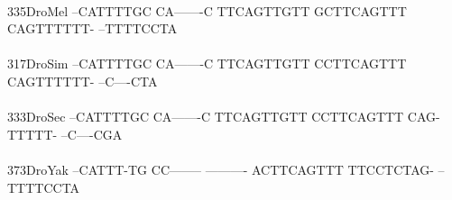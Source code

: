 \documentclass[11pt,twoside,reqno,a4paper]{article}
\begin{document}
{\\
335\hspace*{1\charwidth}DroMel	--CATTTTGC	CA-------C	TTCAGTTGTT	GCTTCAGTTT	CAGTTTTTT-	--TTTTCCTA	\\
\hspace*{4\charwidth}\hspace*{7\charwidth}\hspace*{1\charwidth}\hspace*{1\charwidth}\hspace*{1\charwidth}\hspace*{1\charwidth}\hspace*{1\charwidth}\hspace*{1\charwidth}\\
317\hspace*{1\charwidth}DroSim	--CATTTTGC	CA-------C	TTCAGTTGTT	CCTTCAGTTT	CAGTTTTTT-	--C----CTA	\\
\hspace*{4\charwidth}\hspace*{7\charwidth}\hspace*{1\charwidth}\hspace*{1\charwidth}\hspace*{1\charwidth}\hspace*{1\charwidth}\hspace*{1\charwidth}\hspace*{1\charwidth}\\
333\hspace*{1\charwidth}DroSec	--CATTTTGC	CA-------C	TTCAGTTGTT	CCTTCAGTTT	CAG-TTTTT-	--C----CGA	\\
\hspace*{4\charwidth}\hspace*{7\charwidth}\hspace*{1\charwidth}\hspace*{1\charwidth}\hspace*{1\charwidth}\hspace*{1\charwidth}\hspace*{1\charwidth}\hspace*{1\charwidth}\\
373\hspace*{1\charwidth}DroYak	--CATTT-TG	CC--------	----------	ACTTCAGTTT	TTCCTCTAG-	--TTTTCCTA	\\
\hspace*{4\charwidth}\hspace*{7\charwidth}\hspace*{1\charwidth}\hspace*{1\charwidth}\hspace*{1\charwidth}\hspace*{1\charwidth}\hspace*{1\charwidth}\hspace*{1\charwidth}\\
}
\end{document}
